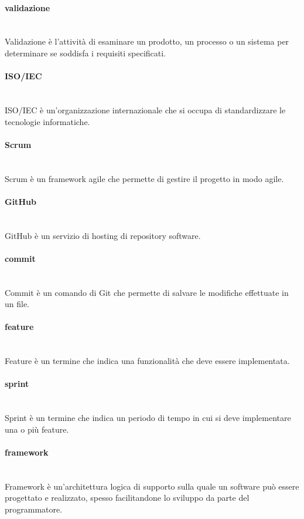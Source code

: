 \paragraph{validazione}~\smallskip \\
Validazione è l'attività di esaminare un prodotto, un processo o un sistema per determinare se soddisfa i requisiti specificati.

\paragraph{ISO/IEC}~\smallskip \\
ISO/IEC è un'organizzazione internazionale che si occupa di standardizzare le tecnologie informatiche.

\paragraph{Scrum}~\smallskip \\
Scrum è un framework agile che permette di gestire il progetto in modo agile.

\paragraph{GitHub}~\smallskip \\
GitHub è un servizio di hosting di repository software.

\paragraph{commit}~\smallskip \\
Commit è un comando di Git che permette di salvare le modifiche effettuate in un file.

\paragraph{feature}~\smallskip \\
Feature è un termine che indica una funzionalità che deve essere implementata.

\paragraph{sprint}~\smallskip \\
Sprint è un termine che indica un periodo di tempo in cui si deve implementare una o più feature.

\paragraph{framework}~\smallskip \\
Framework è un'architettura logica di supporto sulla quale un software può essere progettato e realizzato, spesso facilitandone lo sviluppo da parte del programmatore.
